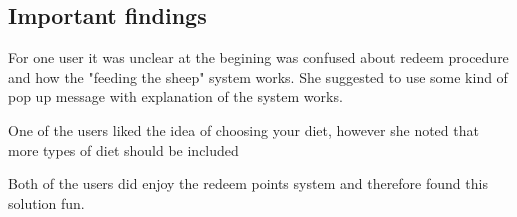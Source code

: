 \subsection{Important findings}
 \item For one user it was unclear at the begining was confused about redeem procedure and how the "feeding the sheep" system
works. She suggested to use some kind of pop up message with explanation of the system works.
 \item One of the users liked the idea of choosing your diet, however she noted that more types of diet should be included
 \item Both of the users did enjoy the redeem points system and therefore found this solution fun.
